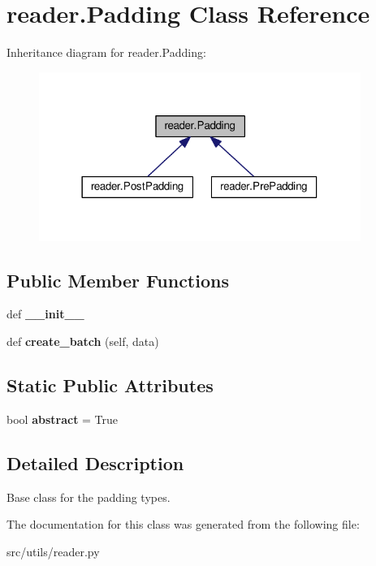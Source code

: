 \hypertarget{classreader_1_1Padding}{}\section{reader.\+Padding Class Reference}
\label{classreader_1_1Padding}


Inheritance diagram for reader.\+Padding\+:
\nopagebreak
\begin{figure}[H]
\begin{center}
\leavevmode
\includegraphics[width=297pt]{classreader_1_1Padding__inherit__graph}
\end{center}
\end{figure}
\subsection*{Public Member Functions}
\begin{DoxyCompactItemize}
\item 
def {\bfseries \+\_\+\+\_\+init\+\_\+\+\_\+}\hypertarget{classreader_1_1Padding_a5c55a3d36cf30069712604e297ed51ba}{}\label{classreader_1_1Padding_a5c55a3d36cf30069712604e297ed51ba}

\item 
def {\bfseries create\+\_\+batch} (self, data)\hypertarget{classreader_1_1Padding_a5e61b883d0ed5c242cba875bdb52ed0c}{}\label{classreader_1_1Padding_a5e61b883d0ed5c242cba875bdb52ed0c}

\end{DoxyCompactItemize}
\subsection*{Static Public Attributes}
\begin{DoxyCompactItemize}
\item 
bool {\bfseries abstract} = True\hypertarget{classreader_1_1Padding_a7fc512c695d05f5d67b8f5cc84c2878b}{}\label{classreader_1_1Padding_a7fc512c695d05f5d67b8f5cc84c2878b}

\end{DoxyCompactItemize}


\subsection{Detailed Description}
\begin{DoxyVerb}Base class for the padding types.
\end{DoxyVerb}
 

The documentation for this class was generated from the following file\+:\begin{DoxyCompactItemize}
\item 
src/utils/reader.\+py\end{DoxyCompactItemize}
